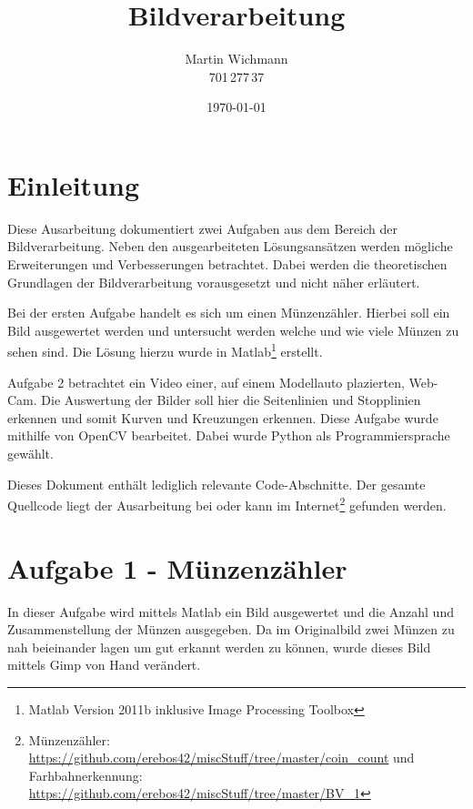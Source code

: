 \documentclass[a4paper,DIV=calc,ngerman]{scrartcl}
\begin{document}
\titlehead{}
\title{Bildverarbeitung}
\author{Martin Wichmann\\701\,277\,37}
\date{\today}

\maketitle
\tableofcontents

\thispagestyle{empty}

\newpage
\setcounter{page}{1}

\section{Einleitung}
\label{sec:Einleitung}
Diese Ausarbeitung dokumentiert zwei Aufgaben aus dem Bereich der Bildverarbeitung. Neben den ausgearbeiteten Lösungsansätzen werden mögliche Erweiterungen und Verbesserungen betrachtet. Dabei werden die theoretischen Grundlagen der Bildverarbeitung vorausgesetzt und nicht näher erläutert.

Bei der ersten Aufgabe handelt es sich um einen Münzenzähler. Hierbei soll ein Bild ausgewertet werden und untersucht werden welche und wie viele Münzen zu sehen sind. Die Lösung hierzu wurde in Matlab\footnote{Matlab Version 2011b inklusive Image Processing Toolbox} erstellt.

Aufgabe 2 betrachtet ein Video einer, auf einem Modellauto plazierten, Web-Cam. Die Auswertung der Bilder soll hier die Seitenlinien und Stopplinien erkennen und somit Kurven und Kreuzungen erkennen. Diese Aufgabe wurde mithilfe von OpenCV bearbeitet. Dabei wurde Python als Programmiersprache gewählt.

Dieses Dokument enthält lediglich relevante Code-Abschnitte. Der gesamte Quellcode liegt der Ausarbeitung bei oder kann im Internet\footnote{Münzenzähler: \url{https://github.com/erebos42/miscStuff/tree/master/coin_count} und Farhbahnerkennung: \url{https://github.com/erebos42/miscStuff/tree/master/BV_1}} gefunden werden.




\section{Aufgabe 1 - Münzenzähler}
\label{sec:aufgabe1}
In dieser Aufgabe wird mittels Matlab ein Bild ausgewertet und die Anzahl und Zusammenstellung der Münzen ausgegeben. Da im Originalbild zwei Münzen zu nah beieinander lagen um gut erkannt werden zu können, wurde dieses Bild mittels Gimp von Hand verändert.
\end{document}
